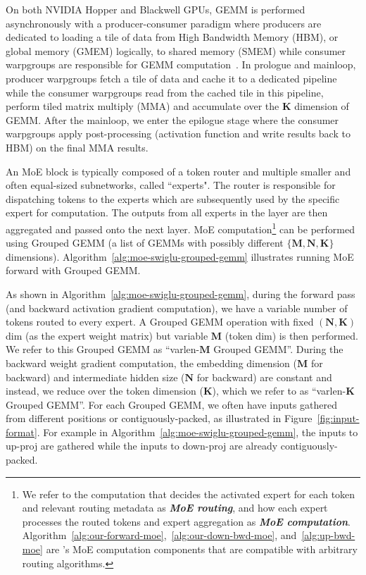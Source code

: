 
On both NVIDIA Hopper and Blackwell GPUs, GEMM is performed asynchronously with a producer-consumer paradigm \citep{shah2024flashattention3fastaccurateattention} where producers are dedicated to loading a tile of data from High Bandwidth Memory (HBM), or global memory (GMEM) logically, to shared memory (SMEM) while consumer warpgroups are responsible for GEMM computation~\citep{shah2024flashattention3fastaccurateattention}. In prologue and mainloop, producer warpgroups fetch a tile of data and cache it to a dedicated pipeline while the consumer warpgroups read from the cached tile in this pipeline, perform tiled matrix multiply (MMA) and accumulate over the $\mathbf{K}$ dimension of GEMM. After the mainloop, we enter the epilogue stage where the consumer warpgroups apply post-processing (activation function and write results back to HBM) on the final MMA results.

An MoE block is typically composed of a token router and multiple smaller and often equal-sized subnetworks, called ``experts". The router is responsible for dispatching tokens to the experts which are subsequently used by the specific expert for computation. The outputs from all experts in the layer are then aggregated and passed onto the next layer. MoE computation\footnote{\label{footnote:moe_main_computation}We refer to the computation that decides the activated expert for each token and relevant routing metadata as \textit{\textbf{MoE routing}}, and how each expert processes the routed tokens and expert aggregation as \textit{\textbf{MoE computation}}. Algorithm~\ref{alg:our-forward-moe},~\ref{alg:our-down-bwd-moe}, and~\ref{alg:up-bwd-moe} are \Algname's MoE computation components that are compatible with arbitrary routing algorithms. } can be performed using Grouped GEMM (a list of GEMMs with possibly different $\{\mathbf{M}, \mathbf{N}, \mathbf{K}\}$ dimensions). Algorithm~\ref{alg:moe-swiglu-grouped-gemm} illustrates running MoE forward with Grouped GEMM. 

As shown in Algorithm~\ref{alg:moe-swiglu-grouped-gemm}, during the forward pass (and backward activation gradient computation), we have a variable number of tokens routed to every expert. A Grouped GEMM operation with fixed $(\mathbf{N},\mathbf{K})$ dim (as the expert weight matrix) but variable $\mathbf{M}$ (token dim) is then performed. We refer to this Grouped GEMM as ``varlen-$\mathbf{M}$ Grouped GEMM''. During the backward weight gradient computation, the embedding dimension ($\mathbf{M}$ for backward) and intermediate hidden size ($\mathbf{N}$ for backward) are constant and instead, we reduce over the token dimension ($\mathbf{K}$), which we refer to as ``varlen-$\mathbf{K}$ Grouped GEMM''. For each Grouped GEMM, we often have inputs gathered from different positions or contiguously-packed, as illustrated in Figure~\ref{fig:input-format}. For example in Algorithm~\ref{alg:moe-swiglu-grouped-gemm}, the inputs to up-proj are gathered while the inputs to down-proj are already contiguously-packed. 

